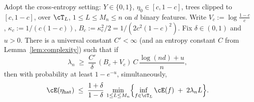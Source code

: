 \begin{theorem}\label{thm:ce-oracle}
Adopt the cross-entropy setting: $Y \in \{0,1\}$, $\eta_0 \in [c,1-c]$, trees
clipped to $[c,1-c]$, over $\cT_L$, $1 \le L \le M_n \le n$ on $d$ binary
features. Write $V_c := \log\!\frac{1-c}{c}$, $\kappa_c := 1/(c(1-c))$,
$B_c := \kappa_c^2/2 = 1/(2c^2(1-c)^2)$. Fix $\delta \in (0,1)$ and $u > 0$.
There is a universal constant $C' < \infty$ (and an entropy constant $C$ from
Lemma~\ref{lem:complexity}) such that if
\begin{equation}\label{eq:lambda-cond}
  \lambda_n \;\ge\; \frac{C'}{\delta}\,(B_c + V_c)\, C\,
    \frac{\log(nd) + u}{n},
\end{equation}
then with probability at least $1 - e^{-u}$, simultaneously,
\begin{equation}\label{eq:oracle}
  \cE(\eta_{\text{hat}})
  \;\le\; \frac{1+\delta}{1-\delta}\,
  \min_{1 \le L \le M_n}
  \Bigl\{ \inf_{f \in \cT_L} \cE(f) \;+\; 2\lambda_n L \Bigr\}.
\end{equation}
\end{theorem}

